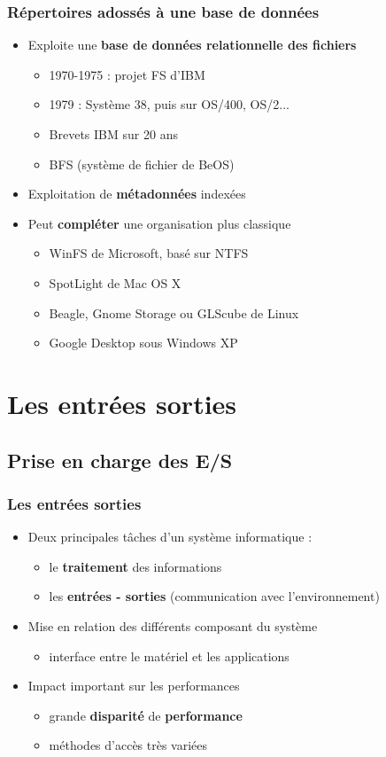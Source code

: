 \begin{frame}
\frametitle{Répertoires adossés à une base de données}
\begin{itemize}
\item Exploite une \textbf{base de données relationnelle des fichiers}
\begin{itemize}
\item 1970-1975 : projet FS d'IBM
\item 1979 : Système 38, puis sur OS/400, OS/2...
\item Brevets IBM sur 20 ans
\item BFS (système de fichier de BeOS)
\end{itemize}
\item Exploitation de \textbf{métadonnées} indexées
\item Peut \textbf{compléter} une organisation plus classique
\begin{itemize}
\item WinFS de Microsoft, basé sur NTFS
\item SpotLight de Mac OS X
\item Beagle, Gnome Storage ou GLScube de Linux
\item Google Desktop sous Windows XP
\end{itemize}
\end{itemize}
\end{frame}


\section{Les entrées sorties}
\subsection{Prise en charge des E/S}


\begin{frame}
\frametitle{Les entrées sorties}
\begin{itemize}
\item Deux principales tâches d'un système informatique :
\begin{itemize}
\item le \textbf{traitement} des informations
\item les \textbf{entrées - sorties} (communication avec l'environnement)
\end{itemize}
\item Mise en relation des différents composant du système
\begin{itemize}
\item interface entre le matériel et les applications
\end{itemize}
\item Impact important sur les performances
\begin{itemize}
\item grande \textbf{disparité} de \textbf{performance}
\item méthodes d'accès très variées
\end{itemize}
\end{itemize}
\end{frame}

